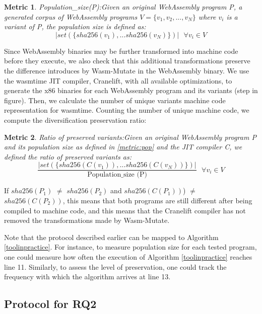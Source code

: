 \documentclass[a4paper,fleqn]{cas-dc}
\newcommand{\tool}{{\sc Wasm-Mutate}\xspace}
\newcommand{\Wasm}{WebAssembly\xspace}
\newcommand{\wasm}{\Wasm}
\newtheorem{metric}{Metric}
\newcommand*\step[1]{
\noindent\tikz[baseline=(char.base)]{
        \node[shape=circle,text=black,draw=black, fill=white,inner sep=1.2pt] (char) {#1};}}
\begin{document}
\begin{metric}{Population\_size(P):}\label{metric:pop}
Given an original \wasm program P, a generated corpus of \wasm programs $V=\{v_1, v_2, ..., v_N\}$ where $v_i$ is a variant of P, the population size is defined as:
$$
    | set(\{ sha256(v_1), ... sha256(v_N) \})|\text{ }\forall v_i \in V 
$$
\end{metric}


Since \wasm binaries may be further transformed into machine code before they execute, we also check that this additional transformations preserve the difference introduces by \tool in the \wasm binary. 
We use the wasmtime JIT compiler, Cranelift, with all available optimizations, to generate the x86 binaries for each \wasm program and its variants  (step \step{3} in figure). 
Then, we calculate the number of unique variants machine code representation for wasmtime.
Counting the number of unique machine code, we compute the diversification preservation ratio: \\

\begin{metric}{Ratio of preserved variants:}\label{metric:preservation}
    Given an original \wasm program P and its population size as defined in \autoref{metric:pop} and the JIT compiler C, we defined the ratio of preserved variants as:
    $$
        \frac{ | set(\{ sha256(C(v_1)), ... sha256(C(v_N)) \})|}{ \text{Population\_size (P)}} \text{ }\forall v_i \in V 
    $$

    
\end{metric}

If  $sha256(P_1)$ $\neq$ $sha256(P_2)$ and $sha256(C(P_1))$) $\neq$ $sha256(C(P_2))$, this means that  both programs are still different after being compiled to machine code, and this means that the Cranelift compiler has not removed the transformations made by \tool.  

Note that the protocol described earlier can be mapped to Algorithm \autoref{toolinpractice}. 
For instance, to measure population size for each tested program, one could measure how often the execution of Algorithm \autoref{toolinpractice} reaches line 11. 
Similarly, to assess the level of preservation, one could track the frequency with which the algorithm arrives at line 13.

\subsection{Protocol for RQ2}
\newcommand{\samples}{100\xspace}
\end{document}
